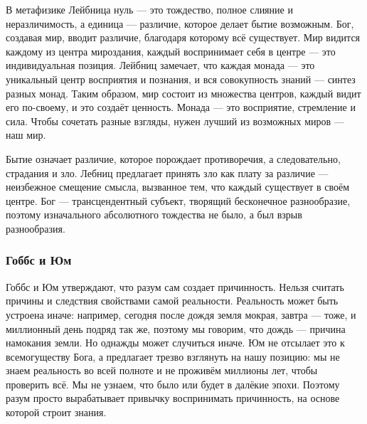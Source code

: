 В метафизике Лейбница нуль --- это тождество, полное слияние и неразличимость, а единица --- различие, которое делает бытие возможным. Бог, создавая мир, вводит различие, благодаря которому всё существует. Мир видится каждому из центра мироздания, каждый воспринимает себя в центре --- это индивидуальная позиция. Лейбниц замечает, что каждая монада --- это уникальный центр восприятия и познания, и вся совокупность знаний --- синтез разных монад. Таким образом, мир состоит из множества центров, каждый видит его по-своему, и это создаёт ценность. Монада --- это восприятие, стремление и сила. Чтобы сочетать разные взгляды, нужен лучший из возможных миров --- наш мир.

Бытие означает различие, которое порождает противоречия, а следовательно, страдания и зло. Лебниц предлагает принять зло как плату за различие --- неизбежное смещение смысла, вызванное тем, что каждый существует в своём центре. Бог --- трансцендентный субъект, творящий бесконечное разнообразие, поэтому изначального абсолютного тождества не было, а был взрыв разнообразия.

\subsubsection{Гоббс и Юм}

Гоббс и Юм утверждают, что разум сам создает причинность. Нельзя считать причины и следствия свойствами самой реальности. Реальность может быть устроена иначе: например, сегодня после дождя земля мокрая, завтра --- тоже, и миллионный день подряд так же, поэтому мы говорим, что дождь --- причина намокания земли. Но однажды может случиться иначе. Юм не отсылает это к всемогуществу Бога, а предлагает трезво взглянуть на нашу позицию: мы не знаем реальность во всей полноте и не проживём миллионы лет, чтобы проверить всё. Мы не узнаем, что было или будет в далёкие эпохи. Поэтому разум просто вырабатывает привычку воспринимать причинность, на основе которой строит знания.

